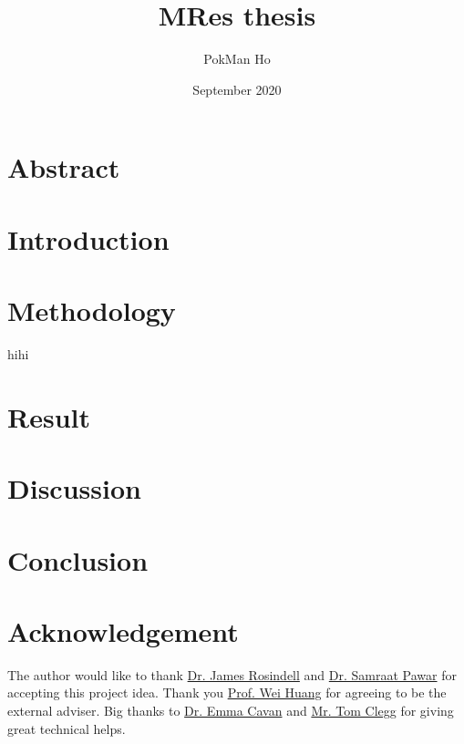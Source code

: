 \documentclass[a4paper,11pt]{article}
\title{MRes thesis}
\author{PokMan Ho}
\date{September 2020}
\begin{document}
\maketitle

\section{Abstract}


\section{Introduction}


\section{Methodology}

hihi\autocite{GPCI2019_summary}
\section{Result}


\section{Discussion}


\section{Conclusion}


\section{Acknowledgement}
The author would like to thank \href{mailto:j.rosindell@imperial.ac.uk}{Dr. James Rosindell} and \href{mailto:s.pawar@imperial.ac.uk}{Dr. Samraat Pawar} for accepting this project idea.  Thank you \href{mailto:wei.huang@eng.ox.ac.uk}{Prof. Wei Huang} for agreeing to be the external adviser.  Big thanks to \href{mailto:e.cavan@imperial.ac.uk}{Dr. Emma Cavan} and \href{mailto:t.clegg17@imperial.ac.uk}{Mr. Tom Clegg} for giving great technical helps.

\nocite{*}\printbibliography
\end{document}
